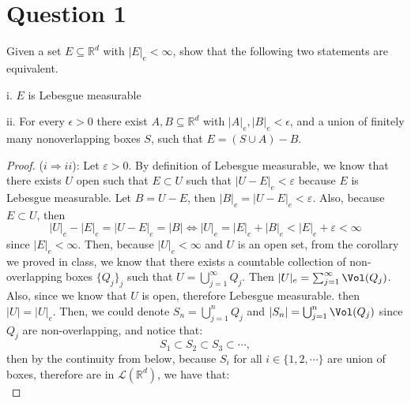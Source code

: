 \section{Question 1}

\begin{question}
    [15 points] Given a set $E \subseteq \mathbb{R}^d$ with $|E|_e<\infty$, show that the following two statements are equivalent.
    
    i. $E$ is Lebesgue measurable
    
    ii. For every $\epsilon>0$ there exist $A, B \subseteq \mathbb{R}^d$ with $|A|_e,|B|_e<\epsilon$, and a union of finitely many nonoverlapping boxes $S$, such that $E=(S \cup A)-B$.
\end{question}

\begin{answer}
    \begin{proof}
        ($i \Rightarrow ii$): Let $\varepsilon > 0$. By definition of Lebesgue measurable, we know that there exists $U$ open such that $E \subset U$ such that $\lvert U - E \rvert_e < \varepsilon$ because $E$ is Lebesgue measurable. Let $B = U - E$, then $\lvert B \rvert_e = \lvert U - E \rvert_e < \varepsilon$. Also, because $E \subset U$, then 
        \begin{equation}
            \lvert U \rvert_e - \lvert E \rvert_e = \lvert U - E \rvert_e = \lvert B \rvert \Leftrightarrow \lvert U \rvert_e = \lvert E \rvert_e + \lvert B \rvert_e < \lvert E \rvert_e + \varepsilon < \infty
        \end{equation}
        since $\lvert E \rvert_e < \infty$. Then, because $\vert U \rvert_e < \infty$ and $U$ is an open set, from the corollary we proved in class, we know that there exists a countable collection of non-overlapping boxes $\{Q_j\}_j$ such that $U = \bigcup_{j=1}^{\infty} Q_j$. Then $\lvert U \rvert_e = \sum_{j=1}^{\infty} \Vol(Q_j)$. Also, since we know that $U$ is open, therefore Lebesgue measurable. then $\lvert U \rvert = \lvert U \rvert_e$. Then, we could denote $S_n = \bigcup_{j=1}^{n} Q_j$ and $\lvert S_n \rvert = \bigcup_{j=1}^{n} \Vol(Q_j)$ since $Q_j$ are non-overlapping, and notice that:
        \begin{equation}
            S_1 \subset S_2 \subset S_3 \subset \cdots,
        \end{equation}
        then by the continuity from below, because $S_i$ for all $i \in \{1,2,\cdots\}$ are union of boxes, therefore are in $\mathcal{L}(\mathbb{R}^d)$, we have that:
        \begin{equation}

\end{equation}
\end{proof}
\end{answer}
